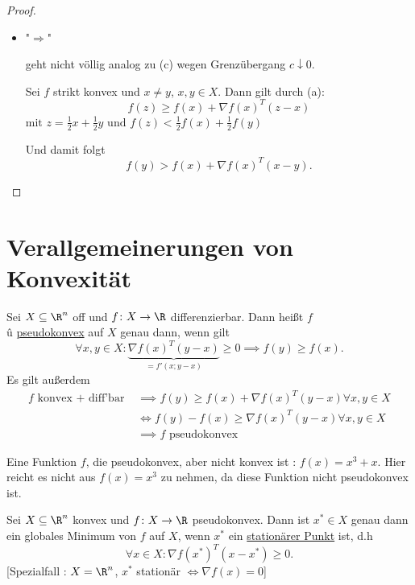 \begin{proof}
\begin{itemize}[label=]
\begin{itemize}[label=]
 \item "$\Rightarrow$"

 geht nicht völlig analog zu (c) wegen Grenzübergang $c \downarrow 0$.

 Sei $f$ strikt konvex und $x\neq y$, $x,y \in X$. Dann gilt durch (a):
\[
	f(z) \geq f(x) + \nabla f(x)^{T}(z-x)
\] 
$  \text{mit }z=\frac{1}{2}x + \frac{1}{2}y \text{ und } f(z) < \frac{1}{2}f(x) + \frac{1}{2}f(y)$ 

Und damit folgt
\[
	f(y) > f(x) + \nabla f(x)^{T}(x-y)
.\] 
	\end{itemize}
\end{itemize}

\end{proof}

\section*{Verallgemeinerungen von Konvexität}
\label{sec:Verallgemeinerungen von Konvexität}

\begin{definition}
\label{thm:pseudokonvexität}
	Sei $X \subseteq \R^{n}$ off und $f \colon X \rightarrow \R $ differenzierbar. Dann heißt $f$\\û \underline{pseudokonvex} auf $X$ genau dann, wenn gilt 
	\[
		\forall x,y \in X \colon \underbrace{\nabla f(x)^{T}(y-x)}_{=f'(x; y-x)} \geq 0 \implies f(y) \geq f(x)
	.\] 
Es gilt außerdem
\begin{align*}
	f \text{ konvex + diff'bar } & \implies f(y) \geq f(x) + \nabla f(x)^{T}(y-x) \forall x,y \in X \\
								 & \iff f(y) - f(x) \geq \nabla f(x)^{T}(y-x) \forall x,y \in X \\
								 &\implies f \text{ pseudokonvex}
\end{align*}
\end{definition}


\begin{beispiel}
\label{thm:bsppseudokonvex}
Eine Funktion $f$, die pseudokonvex, aber nicht konvex ist : $f(x) = x^{3} + x$. Hier reicht es nicht aus $f(x)=x^{3}$ zu nehmen, da diese Funktion nicht pseudokonvex ist.
\end{beispiel}

\begin{satz}
\label{thm:stationäresatz}
	Sei $X \subseteq \R^{n}$ konvex und $f \colon X \rightarrow \R $ pseudokonvex. Dann ist ${x}^{*} \in X$ genau dann ein globales Minimum von $f$ auf $X$, wenn ${x}^{*}$ ein \underline{stationärer Punkt} ist, d.h
	\[
		\forall x \in X \colon \nabla f({x}^{*})^{T}(x-{x}^{*}) \geq 0
	.\]
	[Spezialfall : $X = \R^{n}$, ${x}^{*}$ stationär $\iff \nabla f(x) = 0$]
\end{satz}

